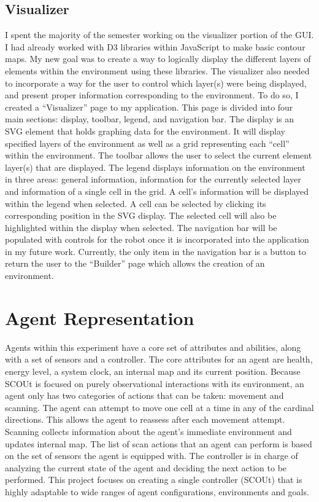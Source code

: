 \documentclass[]{report}
\begin{document}
\subsection{Visualizer}
I spent the majority of the semester working on the visualizer portion of the GUI.
I had already worked with D3 libraries within JavaScript to make basic contour maps.
My new goal was to create a way to logically display the different layers of elements within the environment using these libraries.
The visualizer also needed to incorporate a way for the user to control which layer(s) were being displayed, and present proper information corresponding to the environment.
To do so, I created a “Visualizer” page to my application. This page is divided into four main sections: display, toolbar, legend, and navigation bar.
The display is an SVG element that holds graphing data for the environment.
It will display specified layers of the environment as well as a grid representing each “cell” within the environment.
The toolbar allows the user to select the current element layer(s) that are displayed.
The legend displays information on the environment in three areas: general information, information for the currently selected layer and information of a single cell in the grid.
A cell’s information will be displayed within the legend when selected.
A cell can be selected by clicking its corresponding position in the SVG display.
The selected cell will also be highlighted within the display when selected.
The navigation bar will be populated with controls for the robot once it is incorporated into the application in my future work.
Currently, the only item in the navigation bar is a button to return the user to the “Builder” page which allows the creation of an environment.


\section{Agent Representation}
Agents within this experiment have a core set of attributes and abilities, along with a set of sensors and a controller.
The core attributes for an agent are health, energy level, a system clock, an internal map and its current position.
Because SCOUt is focused on purely observational interactions with its environment, an agent only has two categories of actions that can be taken: movement and scanning.
The agent can attempt to move one cell at a time in any of the cardinal directions.
This allows the agent to reassess after each movement attempt.
Scanning collects information about the agent's immediate environment and updates internal map.
The list of scan actions that an agent can perform is based on the set of sensors the agent is equipped with.
The controller is in charge of analyzing the current state of the agent and deciding the next action to be performed.
This project focuses on creating a single controller (SCOUt) that is highly adaptable to wide ranges of agent configurations, environments and goals.
\end{document}
